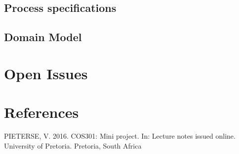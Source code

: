 \documentclass[a4paper,12pt]{report}
\begin{document}
\subsection{Process specifications}

\subsection{Domain Model}


\section{Open Issues}

\newpage
\section{References}
PIETERSE, V. 2016. COS301: Mini project. In: Lecture notes issued online.  University of Pretoria. Pretoria, South Africa
\end{document}
